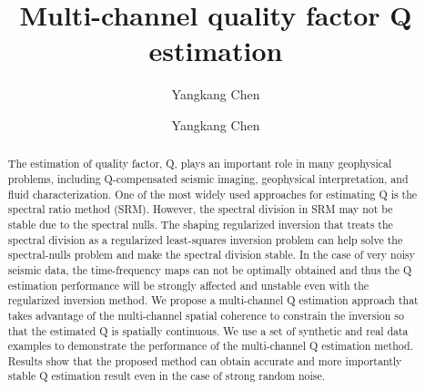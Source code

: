 

\title{Multi-channel quality factor Q estimation}
\author{Yangkang Chen}

\renewcommand{\thefootnote}{\fnsymbol{footnote}}

\author{Yangkang Chen\footnotemark[1]}


\address{
\footnotemark[1]
School of Earth Sciences\\
Zhejiang University\\
Hangzhou, Zhejiang Province, China, 310027\\
yangkang.chen@zju.edu.cn 
}


\begin{abstract}
The estimation of quality factor, Q, plays an important role in many geophysical problems, including Q-compensated seismic imaging, geophysical interpretation, and fluid characterization. One of the most widely used approaches for estimating Q is the spectral ratio method (SRM). However, the spectral division in SRM may not be stable due to the spectral nulls. The shaping regularized inversion that treats the spectral division as a regularized least-squares inversion problem can help solve the spectral-nulls problem and make the spectral division stable. In the case of very noisy seismic data, the time-frequency maps can not be optimally obtained and thus the Q estimation performance will be strongly affected and unstable even with the regularized inversion method. We propose a multi-channel Q estimation approach that takes advantage of the multi-channel spatial coherence to constrain the inversion so that the estimated Q is spatially continuous. We use a set of synthetic and real data examples to demonstrate the performance of the multi-channel Q estimation method. Results show that the proposed method can obtain accurate and more importantly stable Q estimation result even in the case of strong random noise.
\end{abstract}


